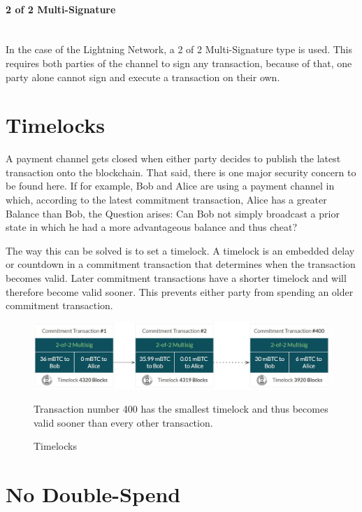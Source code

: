 \documentclass[a4paper, 12pt]{report}
\begin{document}
\paragraph{2 of 2 Multi-Signature} \hspace{0pt} \\
In the case of the Lightning Network, a 2 of 2 Multi-Signature type is used. This requires both parties of the channel to sign any transaction, because of that, one party alone cannot sign and execute a transaction on their own.

\section{Timelocks}

\par A payment channel gets closed when either party decides to publish the latest transaction onto the blockchain. That said, there is one major security concern to be found here. If for example, Bob and Alice are using a payment channel in which, according to the latest commitment transaction, Alice has a greater Balance than Bob, the Question arises: Can Bob not simply broadcast a prior state in which he had a more advantageous balance and thus cheat?

\par The way this can be solved is to set a timelock. A timelock is an embedded delay or countdown in a commitment transaction that determines when the transaction becomes valid. Later commitment transactions have a shorter timelock and will therefore become valid sooner. This prevents either party from spending an older commitment transaction.

\begin{figure}[h]
	\centering
	\includegraphics[width=13cm]{08_Timelocks}
	\caption{Timelocks}
	\medskip
	\small Transaction number 400 has the smallest timelock and thus becomes valid sooner than every other transaction.
	\label{fig:08_Timelocks}
\end{figure}

\section{No Double-Spend}
\end{document}
